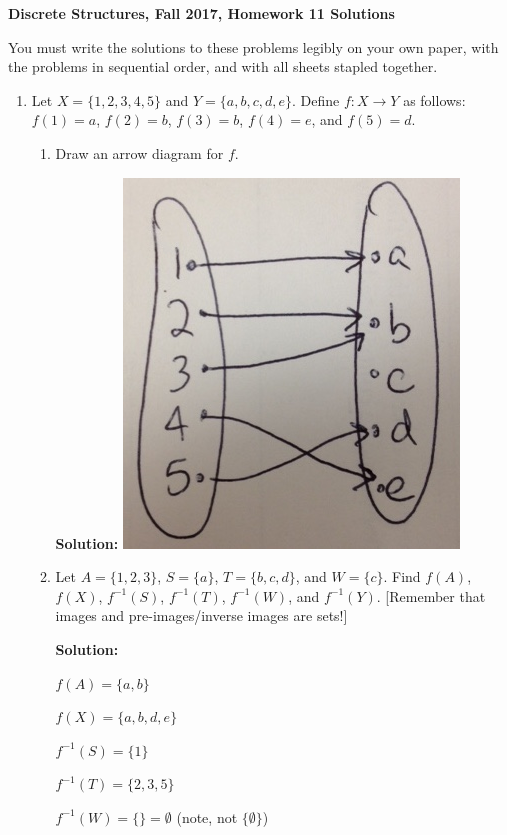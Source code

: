 \documentclass[11pt, letterpaper]{report}
\begin{document}
{\textbf{Discrete Structures, Fall 2017, Homework 11 Solutions}}

\vspace*{.1in}

You must write the solutions to these problems legibly on your own paper, with
the problems in sequential order, and with all sheets stapled together.

\bigskip

\begin{enumerate}

\item Let $X = \{1,2,3,4,5\}$ and  $Y=\{a,b,c,d,e\}$.  Define $f:X\to Y$ as follows: $f(1)=a$, $f(2)=b$, 
$f(3)=b$, $f(4)=e$, and $f(5)=d$.
\begin{enumerate}
	\item Draw an arrow diagram for $f$.
	
	\textbf{Solution:}
	\includegraphics[scale=0.4]{hw10image1.jpg}
	
	\item Let $A= \{1,2,3\}$, $S=\{a\}$, $T=\{b,c,d\}$, and $W=\{c\}$.  Find $f(A)$, $f(X)$, $f^{-1}(S)$, $f^{-1}(T)$, $f^{-1}(W)$, and $f^{-1}(Y)$.  [Remember that images and pre-images/inverse images are sets!]

	
	\textbf{Solution:}
	
	$f(A) = \{a,b\}$
	
	$f(X) = \{a,b,d,e\}$ 
	
	$f^{-1}(S) = \{1\}$
	
	$f^{-1}(T) = \{2,3,5\}$
	
	$f^{-1}(W) = \{\} = \emptyset$  (note, not $\{\emptyset\}$)
	

\end{enumerate}
\end{enumerate}
\end{document}
